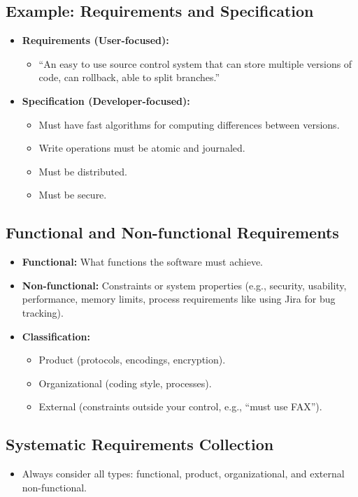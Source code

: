 \documentclass[11pt,a4paper]{article}
\begin{document}
\subsection*{Example: Requirements and Specification}
\begin{itemize}
    \item \textbf{Requirements (User-focused):}
        \begin{itemize}
            \item ``An easy to use source control system that can store multiple versions of code, can rollback, able to split branches.''
        \end{itemize}
    \item \textbf{Specification (Developer-focused):}
        \begin{itemize}
            \item Must have fast algorithms for computing differences between versions.
            \item Write operations must be atomic and journaled.
            \item Must be distributed.
            \item Must be secure.
        \end{itemize}
\end{itemize}

\subsection*{Functional and Non-functional Requirements}
\begin{itemize}
    \item \textbf{Functional:} What functions the software must achieve.
    \item \textbf{Non-functional:} Constraints or system properties (e.g., security, usability, performance, memory limits, process requirements like using Jira for bug tracking).
    \item \textbf{Classification:}
        \begin{itemize}
            \item Product (protocols, encodings, encryption).
            \item Organizational (coding style, processes).
            \item External (constraints outside your control, e.g., ``must use FAX'').
        \end{itemize}
\end{itemize}

\subsection*{Systematic Requirements Collection}
\begin{itemize}
    \item Always consider all types: functional, product, organizational, and external non-functional.
\end{itemize}
\end{document}
